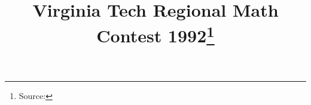 \documentclass[10pt]{article}
\begin{document}
\title{Virginia Tech Regional Math Contest 1992\footnote{Source: \source}}
\author{\vspace{-2ex}}
\date{\vspace{-6ex}} %
\maketitle








\end{document}
